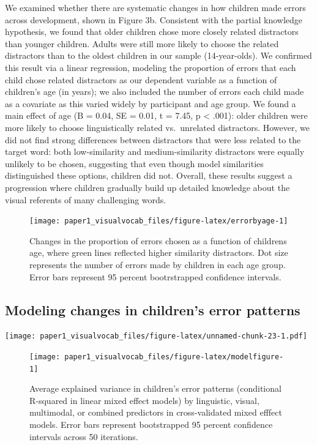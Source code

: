 \documentclass[
  man,mask]{apa6}
\begin{document}
We examined whether there are systematic changes in how children made errors across development, shown in Figure 3b. Consistent with the partial knowledge hypothesis, we found that older children chose more closely related distractors than younger children. Adults were still more likely to choose the related distractors than to the oldest children in our sample (14-year-olds). We confirmed this result via a linear regression, modeling the proportion of errors that each child chose related distractors as our dependent variable as a function of children's age (in years); we also included the number of errors each child made as a covariate as this varied widely by participant and age group. We found a main effect of age (B = 0.04, SE = 0.01, t = 7.45, p \textless{} .001): older children were more likely to choose linguistically related vs.~unrelated distractors. However, we did not find strong differences between distractors that were less related to the target word: both low-similarity and medium-similarity distractors were equally unlikely to be chosen, suggesting that even though model similarities distinguished these options, children did not. Overall, these results suggest a progression where children gradually build up detailed knowledge about the visual referents of many challenging words.

\begin{figure}[H]

{\centering \texttt{[image: paper1\_visualvocab\_files/figure-latex/errorbyage-1]} 

}

\caption{Changes in the proportion of errors chosen as a function of childrens age, where green lines reflected higher similarity distractors. Dot size represents the number of errors made by children in each age group. Error bars represent 95 percent bootrstrapped confidence intervals.}\label{fig:errorbyage}
\end{figure}

\subsection{Modeling changes in children's error patterns}\label{modeling-changes-in-childrens-error-patterns}

\texttt{[image: paper1\_visualvocab\_files/figure-latex/unnamed-chunk-23-1.pdf]}

\begin{figure}[H]

{\centering \texttt{[image: paper1\_visualvocab\_files/figure-latex/modelfigure-1]} 

}

\caption{Average explained variance in children's error patterns (conditional R-squared in linear mixed effect models) by linguistic, visual, multimodal, or combined predictors in cross-validated mixed efffect models. Error bars represent bootstrapped 95 percent confidence intervals across 50 iterations.}\label{fig:modelfigure}
\end{figure}
\end{document}
